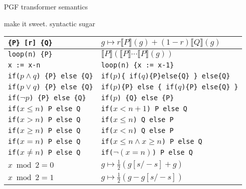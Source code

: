 \documentclass[8pt]{beamer}
\renewcommand{\S}[1]{ \llbracket #1 \rrbracket }
\begin{document}
\begin{frame}[allowframebreaks]{PGF transformer semantics}
	\begin{block}{make it sweet. syntactic sugar}
		\begin{center}
			\begin{tabular}{l|l}
				\hline
				\texttt{\{P\} [r] \{Q\}}                   & \(g\mapsto r\S{P}(g) + (1-r)\S{Q}(g)\)                      \\
				\hline
				\texttt{loop(n) \{P\}}                     & \(\S{P}(\S{P}\cdots \S{P}(g))\)                             \\
				\texttt{x := x-n}                          & \texttt{loop(n) \{x := x-1\}}                               \\
				\hline
				\texttt{if(\(p\land q\)) \{P\} else \{Q\}} & \texttt{if(\(p\))\{ if(\(q\))\{P\}else\{Q\} \} else\{Q\}}   \\
				\texttt{if(\(p\lor q\)) \{P\} else \{Q\}}  & \texttt{if(\(p\))\{P\} else \{ if(\(q\))\{P\} else\{Q\} \}} \\
				\texttt{if(\(\lnot p\)) \{P\} else \{Q\}}  & \texttt{if(\(p\)) \{Q\} else \{P\}}                         \\
				\hline
				\texttt{if(\(x\leq n\))  P else Q}         & \texttt{if(\(x<n+1\)) P else Q}                             \\
				\texttt{if(\(x> n\))     P else Q}         & \texttt{if(\(x\leq n\)) Q else P}                           \\
				\texttt{if(\(x\geq n\))  P else Q}         & \texttt{if(\(x<n\)) Q else P}                               \\
				\texttt{if(\(x =  n\))   P else Q}         & \texttt{if(\(x\leq n \land x \geq n\)) P else Q}            \\
				\texttt{if(\(x \neq n\)) P else Q}         & \texttt{if(\(\lnot (x=n)\)) P else Q}                       \\
				\hline
				\(x \bmod 2 = 0\)                          & \(g\mapsto \frac12(g[s/-s] + g)\)                           \\
				\(x \bmod 2 = 1\)                          & \(g\mapsto \frac12(g - g[s/-s])\)                           \\
				\hline
			\end{tabular}
		\end{center}
	\end{block}
\end{frame}
\end{document}
